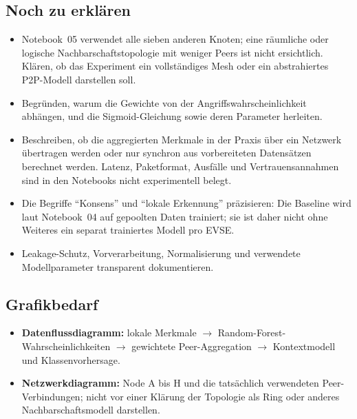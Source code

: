 \subsection{Noch zu erklären}
\begin{itemize}
  \item Notebook~05 verwendet alle sieben anderen Knoten; eine räumliche oder
        logische Nachbarschaftstopologie mit weniger Peers ist nicht ersichtlich.
        Klären, ob das Experiment ein vollständiges Mesh oder ein abstrahiertes
        P2P-Modell darstellen soll.
  \item Begründen, warum die Gewichte von der Angriffswahrscheinlichkeit
        abhängen, und die Sigmoid-Gleichung sowie deren Parameter herleiten.
  \item Beschreiben, ob die aggregierten Merkmale in der Praxis über ein
        Netzwerk übertragen werden oder nur synchron aus vorbereiteten
        Datensätzen berechnet werden. Latenz, Paketformat, Ausfälle und
        Vertrauensannahmen sind in den Notebooks nicht experimentell belegt.
  \item Die Begriffe ``Konsens'' und ``lokale Erkennung'' präzisieren:
        Die Baseline wird laut Notebook~04 auf gepoolten Daten trainiert;
        sie ist daher nicht ohne Weiteres ein separat trainiertes Modell
        pro EVSE.
  \item Leakage-Schutz, Vorverarbeitung, Normalisierung und verwendete
        Modellparameter transparent dokumentieren.
\end{itemize}

\subsection{Grafikbedarf}
\begin{itemize}
  \item \textbf{Datenflussdiagramm:} lokale Merkmale
        $\rightarrow$ Random-Forest-Wahrscheinlichkeiten
        $\rightarrow$ gewichtete Peer-Aggregation
        $\rightarrow$ Kontextmodell und Klassenvorhersage.
  \item \textbf{Netzwerkdiagramm:} Node A bis H und die tatsächlich
        verwendeten Peer-Verbindungen; nicht vor einer Klärung der Topologie
        als Ring oder anderes Nachbarschaftsmodell darstellen.
\end{itemize}
